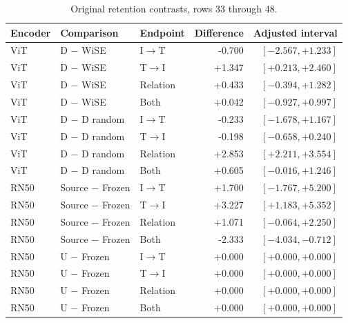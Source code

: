 \begin{table}[t]
\centering
\small
\setlength{\tabcolsep}{3pt}
\begin{tabular}{lllrr}
\toprule
Encoder & Comparison & Endpoint & Difference & Adjusted interval\\
\midrule
ViT & D $-$ WiSE & I$\to$T & -0.700 & $[-2.567,+1.233]$ \\
ViT & D $-$ WiSE & T$\to$I & +1.347 & $[+0.213,+2.460]$ \\
ViT & D $-$ WiSE & Relation & +0.433 & $[-0.394,+1.282]$ \\
ViT & D $-$ WiSE & Both & +0.042 & $[-0.927,+0.997]$ \\
ViT & D $-$ D random & I$\to$T & -0.233 & $[-1.678,+1.167]$ \\
ViT & D $-$ D random & T$\to$I & -0.198 & $[-0.658,+0.240]$ \\
ViT & D $-$ D random & Relation & +2.853 & $[+2.211,+3.554]$ \\
ViT & D $-$ D random & Both & +0.605 & $[-0.016,+1.246]$ \\
RN50 & Source $-$ Frozen & I$\to$T & +1.700 & $[-1.767,+5.200]$ \\
RN50 & Source $-$ Frozen & T$\to$I & +3.227 & $[+1.183,+5.352]$ \\
RN50 & Source $-$ Frozen & Relation & +1.071 & $[-0.064,+2.250]$ \\
RN50 & Source $-$ Frozen & Both & -2.333 & $[-4.034,-0.712]$ \\
RN50 & U $-$ Frozen & I$\to$T & +0.000 & $[+0.000,+0.000]$ \\
RN50 & U $-$ Frozen & T$\to$I & +0.000 & $[+0.000,+0.000]$ \\
RN50 & U $-$ Frozen & Relation & +0.000 & $[+0.000,+0.000]$ \\
RN50 & U $-$ Frozen & Both & +0.000 & $[+0.000,+0.000]$ \\
\bottomrule
\end{tabular}
\caption{Original retention contrasts, rows 33 through 48.}\label{tab:originalretention32}
\end{table}


